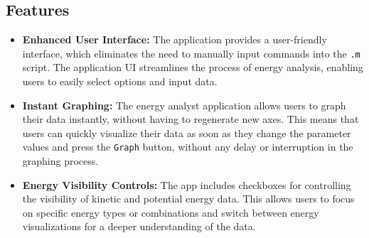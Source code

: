 \documentclass[13pt,a4paper]{report}
\begin{document}
\subsection{Features}
\begin{itemize}[leftmargin=0.65cm,itemsep=0.25cm]
    \item \textbf{Enhanced User Interface:} The application provides a user-friendly interface, which eliminates the need to manually input commands into the \texttt{.m} script. The application UI streamlines the process of energy analysis, enabling users to easily select options and input data.
    \item \textbf{Instant Graphing:} The energy analyst application allows users to graph their data instantly, without having to regenerate new axes. This means that users can quickly visualize their data as soon as they change the parameter values and press the \texttt{Graph} button, without any delay or interruption in the graphing process.
    \item \textbf{Energy Visibility Controls:} The app includes checkboxes for controlling the visibility of kinetic and potential energy data. This allows users to focus on specific energy types or combinations and switch between energy visualizations for a deeper understanding of the data.
\end{itemize}

\newpage
\end{document}
